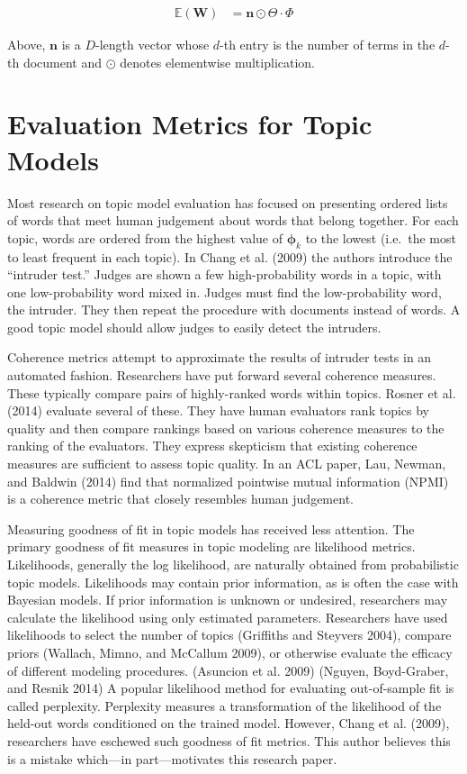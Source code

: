 \documentclass[conference,final,]{IEEEtran}
\begin{document}
\begin{align}
  \mathbb{E}(\mathbf{W}) &= \mathbf{n} \odot \Theta \cdot \Phi
\end{align}

Above, \(\mathbf{n}\) is a \(D\)-length vector whose \(d\)-th entry is
the number of terms in the \(d\)-th document and \(\odot\) denotes
elementwise multiplication.

\hypertarget{evaluation-metrics-for-topic-models}{%
\section{Evaluation Metrics for Topic
Models}\label{evaluation-metrics-for-topic-models}}

Most research on topic model evaluation has focused on presenting
ordered lists of words that meet human judgement about words that belong
together. For each topic, words are ordered from the highest value of
\(\boldsymbol\phi_k\) to the lowest (i.e.~the most to least frequent in
each topic). In Chang et al. (2009) the authors introduce the ``intruder
test.'' Judges are shown a few high-probability words in a topic, with
one low-probability word mixed in. Judges must find the low-probability
word, the intruder. They then repeat the procedure with documents
instead of words. A good topic model should allow judges to easily
detect the intruders.

Coherence metrics attempt to approximate the results of intruder tests
in an automated fashion. Researchers have put forward several coherence
measures. These typically compare pairs of highly-ranked words within
topics. Rosner et al. (2014) evaluate several of these. They have human
evaluators rank topics by quality and then compare rankings based on
various coherence measures to the ranking of the evaluators. They
express skepticism that existing coherence measures are sufficient to
assess topic quality. In an ACL paper, Lau, Newman, and Baldwin (2014)
find that normalized pointwise mutual information (NPMI) is a coherence
metric that closely resembles human judgement.

Measuring goodness of fit in topic models has received less attention.
The primary goodness of fit measures in topic modeling are likelihood
metrics. Likelihoods, generally the log likelihood, are naturally
obtained from probabilistic topic models. Likelihoods may contain prior
information, as is often the case with Bayesian models. If prior
information is unknown or undesired, researchers may calculate the
likelihood using only estimated parameters. Researchers have used
likelihoods to select the number of topics (Griffiths and Steyvers
2004), compare priors (Wallach, Mimno, and McCallum 2009), or otherwise
evaluate the efficacy of different modeling procedures. (Asuncion et al.
2009) (Nguyen, Boyd-Graber, and Resnik 2014) A popular likelihood method
for evaluating out-of-sample fit is called perplexity. Perplexity
measures a transformation of the likelihood of the held-out words
conditioned on the trained model. However, Chang et al. (2009),
researchers have eschewed such goodness of fit metrics. This author
believes this is a mistake which---in part---motivates this research
paper.
\end{document}
